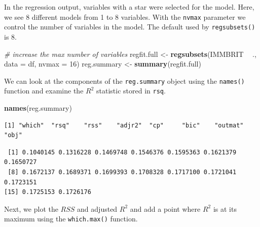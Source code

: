 \documentclass[]{article}
\newenvironment{Shaded}{\begin{snugshade}}{\end{snugshade}}
\newcommand{\CommentTok}[1]{\textcolor[rgb]{0.56,0.35,0.01}{\textit{#1}}}
\newcommand{\DataTypeTok}[1]{\textcolor[rgb]{0.13,0.29,0.53}{#1}}
\newcommand{\DecValTok}[1]{\textcolor[rgb]{0.00,0.00,0.81}{#1}}
\newcommand{\KeywordTok}[1]{\textcolor[rgb]{0.13,0.29,0.53}{\textbf{#1}}}
\newcommand{\NormalTok}[1]{#1}
\newcommand{\OperatorTok}[1]{\textcolor[rgb]{0.81,0.36,0.00}{\textbf{#1}}}
\newcommand{\StringTok}[1]{\textcolor[rgb]{0.31,0.60,0.02}{#1}}
\begin{document}
In the regression output, variables with a star were selected for the model. Here, we see 8 different models from 1 to 8 variables. With the \texttt{nvmax} parameter we control the number of variables in the model. The default used by \texttt{regsubsets()} is 8.

\begin{Shaded}
\begin{Highlighting}[]
\CommentTok{# increase the max number of variables}
\NormalTok{regfit.full <-}\StringTok{ }\KeywordTok{regsubsets}\NormalTok{(IMMBRIT }\OperatorTok{~}\StringTok{ }\NormalTok{., }\DataTypeTok{data =}\NormalTok{ df, }\DataTypeTok{nvmax =} \DecValTok{16}\NormalTok{)}
\NormalTok{reg.summary <-}\StringTok{ }\KeywordTok{summary}\NormalTok{(regfit.full)}
\end{Highlighting}
\end{Shaded}

We can look at the components of the \texttt{reg.summary} object using the \texttt{names()} function and examine the \(R^2\) statistic stored in \texttt{rsq}.

\begin{Shaded}
\begin{Highlighting}[]
\KeywordTok{names}\NormalTok{(reg.summary)}
\end{Highlighting}
\end{Shaded}

\begin{verbatim}
[1] "which"  "rsq"    "rss"    "adjr2"  "cp"     "bic"    "outmat" "obj"   
\end{verbatim}

\begin{Shaded}
\end{Shaded}

\begin{verbatim}
 [1] 0.1040145 0.1316228 0.1469748 0.1546376 0.1595363 0.1621379 0.1650727
 [8] 0.1672137 0.1689371 0.1699393 0.1708328 0.1717100 0.1721041 0.1723151
[15] 0.1725153 0.1726176
\end{verbatim}

Next, we plot the \(RSS\) and adjusted \(R^2\) and add a point where \(R^2\) is at its maximum using the \texttt{which.max()} function.
\end{document}
